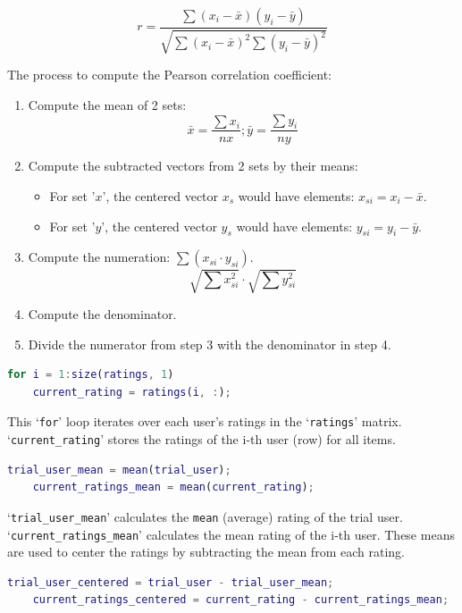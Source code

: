 \[ r = \dfrac{\sum (x_{i} - \bar{x})(y_{i} - \bar{y})}{\sqrt{\sum (x_{i} - \bar{x})^{2} \sum (y_{i} - \bar{y})^{2}}} \]

The process to compute the Pearson correlation coefficient:

\begin{enumerate}[label=Step \arabic*: ]
	\item Compute the mean of 2 sets:
		\[ \bar{x} = \dfrac{\sum x_{i}}{n x} ; \bar{y} = \dfrac{\sum y_{i}}{n y} \]
	\item Compute the subtracted vectors from 2 sets by their means:
		\begin{itemize}[label=-]
			\item For set '$x$', the centered vector $x_{s}$ would have elements: $ x_{si} = x_{i} - \bar{x} $.
			\item For set '$y$', the centered vector $y_{s}$ would have elements: $y_{si} = y_{i} - \bar{y}$.
		\end{itemize}
	\item Compute the numeration: $\sum(x_{si} \cdot y_{si})$.
	\[ \sqrt{\sum x_{si}^{2}} \cdot \sqrt{\sum y_{si}^{2}} \]
	\item Compute the denominator.
	\item Divide the numerator from step 3 with the denominator in step 4.
\end{enumerate}

\begin{lstlisting}[style=StyleCode, language=MATLAB]
	for i = 1:size(ratings, 1)
	current_rating = ratings(i, :);
\end{lstlisting}

This ‘\texttt{for}’ loop iterates over each user's ratings in the ‘\texttt{ratings}’ matrix. ‘\texttt{current\_rating}’ stores the ratings of the i-th user (row) for all items. 

\begin{lstlisting}[style=StyleCode, language=MATLAB]
	trial_user_mean = mean(trial_user); 
	current_ratings_mean = mean(current_rating); 
\end{lstlisting}

‘\texttt{trial\_user\_mean}’ calculates the \texttt{mean} (average) rating of the trial user. ‘\texttt{current\_ratings\_mean}’ calculates the mean rating of the i-th user. 
These means are used to center the ratings by subtracting the mean from each rating.

\begin{lstlisting}[style=StyleCode, language=MATLAB]
	trial_user_centered = trial_user - trial_user_mean;
	current_ratings_centered = current_rating - current_ratings_mean;
\end{lstlisting}

